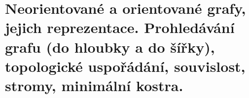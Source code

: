 \section[PAL - Grafy - refrezentace a algoritmy]{Neorientované a orientované grafy, jejich reprezentace. Prohledávání grafu (do hloubky a do šířky), topologické uspořádání, souvislost, stromy, minimální kostra.}
